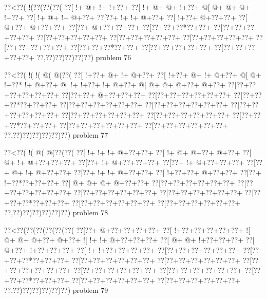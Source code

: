 \vbox{\vbox{\goo
\0??<\0??(\- !(\0??(\0??(\0??(
\0??[\- !+\- @+\- !+\- !+\0??+
\0??[\- !+\- @+\- @+\- !+\0??+
\- @[\- @+\- @+\- @+\- !+\0??+
\0??[\- !+\- @+\- !+\- @+\0??+
\0??[\0??+\- !+\- !+\- @+\0??+
\0??[\- !+\0??+\- @+\0??+\0??+
\0??[\- @+\0??+\- @+\0??+\0??+
\0??[\0??+\- @+\0??+\0??+\0??+
\0??[\0??+\0??+\0??*\0??+\0??+
\0??[\0??+\0??+\0??+\0??+\0??+
\0??[\0??+\0??+\0??+\0??+\0??+
\0??[\0??+\0??+\0??+\0??+\0??+
\0??[\0??+\0??+\0??+\0??+\0??+
\0??[\0??+\0??+\0??+\0??+\0??+
\0??[\0??+\0??+\0??*\0??+\0??+
\0??[\0??+\0??+\0??+\0??+\0??+
\0??[\0??+\0??+\0??+\0??+\0??+
\0??,\0??)\0??)\0??)\0??)\0??)
}
\hfil problem 76\hfil\break
}

\vbox{\vbox{\goo
\0??<\0??(\- !(\- !(\- @(\- @(\0??(
\0??[\- !+\0??+\- @+\- !+\- @+\0??+
\0??[\- !+\0??+\- @+\- !+\- @+\0??+
\- @[\- @+\- !+\0??*\- !+\- @+\0??+
\- @[\- !+\- !+\0??+\- !+\- @+\0??+
\- @[\- @+\- @+\- @+\0??+\- @+\0??+
\0??[\0??+\0??+\0??+\0??+\0??+\0??+
\0??[\0??+\0??+\- @+\0??+\0??+\0??+
\0??[\0??+\0??+\0??+\0??+\0??+\0??+
\0??[\0??+\0??+\0??*\0??+\0??+\0??+
\0??[\0??+\0??+\0??+\0??+\0??+\0??+
\0??[\0??+\0??+\0??+\0??+\0??+\0??+
\0??[\0??+\0??+\0??+\0??+\0??+\0??+
\0??[\0??+\0??+\0??+\0??+\0??+\0??+
\0??[\0??+\0??+\0??+\0??+\0??+\0??+
\0??[\0??+\0??+\0??*\0??+\0??+\0??+
\0??[\0??+\0??+\0??+\0??+\0??+\0??+
\0??[\0??+\0??+\0??+\0??+\0??+\0??+
\0??,\0??)\0??)\0??)\0??)\0??)\0??)
}
\hfil problem 77\hfil\break
}

\vbox{\vbox{\goo
\0??<\0??(\- !(\- @(\- @(\0??(\0??(
\0??[\- !+\- !+\- !+\- @+\0??+\0??+
\0??[\- !+\- @+\- @+\0??+\- @+\0??+
\0??[\- @+\- !+\- @+\0??+\0??+\0??+
\0??[\0??+\- !+\- @+\0??+\0??+\0??+
\0??[\0??+\- !+\- @+\0??+\0??+\0??+
\0??[\0??+\- @+\- !+\- @+\0??+\0??+
\0??[\0??+\- !+\- !+\- @+\0??+\0??+
\0??[\- !+\0??+\0??+\- @+\0??+\0??+
\0??[\0??+\- !+\0??*\0??+\0??+\0??+
\0??[\- @+\- @+\- @+\- @+\0??+\0??+
\0??[\0??+\0??+\0??+\0??+\0??+\0??+
\0??[\0??+\0??+\0??+\0??+\0??+\0??+
\0??[\0??+\0??+\0??+\0??+\0??+\0??+
\0??[\0??+\0??+\0??+\0??+\0??+\0??+
\0??[\0??+\0??+\0??*\0??+\0??+\0??+
\0??[\0??+\0??+\0??+\0??+\0??+\0??+
\0??[\0??+\0??+\0??+\0??+\0??+\0??+
\0??,\0??)\0??)\0??)\0??)\0??)\0??)
}
\hfil problem 78\hfil\break
}

\vbox{\vbox{\goo
\0??<\0??(\0??(\0??(\0??(\0??(\0??(
\0??[\0??+\- @+\0??+\0??+\0??+\0??+
\0??[\- !+\0??+\0??+\0??+\0??+\0??+
\- ![\- @+\- @+\- @+\0??+\- @+\0??+
\- ![\- !+\- !+\- @+\0??+\0??+\0??+
\0??[\- @+\- @+\- !+\0??+\0??+\0??+
\0??[\- @+\0??+\- !+\0??+\0??+\0??+
\0??[\- !+\- !+\0??+\0??+\0??+\0??+
\0??[\0??+\0??+\0??+\0??+\0??+\0??+
\0??[\0??+\0??+\0??*\0??+\0??+\0??+
\0??[\0??+\0??+\0??+\0??+\0??+\0??+
\0??[\0??+\0??+\0??+\0??+\0??+\0??+
\0??[\0??+\0??+\0??+\0??+\0??+\0??+
\0??[\0??+\0??+\0??+\0??+\0??+\0??+
\0??[\0??+\0??+\0??+\0??+\0??+\0??+
\0??[\0??+\0??+\0??*\0??+\0??+\0??+
\0??[\0??+\0??+\0??+\0??+\0??+\0??+
\0??[\0??+\0??+\0??+\0??+\0??+\0??+
\0??,\0??)\0??)\0??)\0??)\0??)\0??)
}
\hfil problem 79\hfil\break
}

